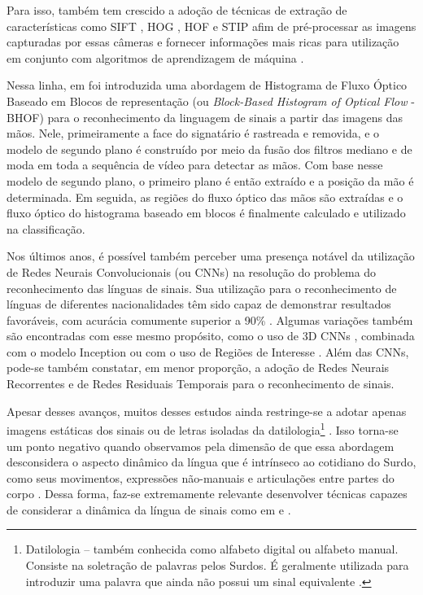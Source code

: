 Para isso, também tem crescido a adoção de técnicas de extração de características como SIFT \cite{lowe-2004}, HOG \cite{dalal-2005}, HOF \cite{laptev-2008} e STIP \cite{laptev-2008} \cite{recent-advances-dl-2017} afim de pré-processar as imagens capturadas por essas câmeras e fornecer informações mais ricas para utilização em conjunto com algoritmos de aprendizagem de máquina \cite{lim-2016, shanta-2018}.

Nessa linha, em \cite{lim-2016} foi introduzida uma abordagem de Histograma de Fluxo Óptico Baseado em Blocos de representação (ou \textit{Block-Based Histogram of Optical Flow} - BHOF) para o reconhecimento da linguagem de sinais a partir das imagens das mãos. Nele, primeiramente a face do signatário é rastreada e removida, e o modelo de segundo plano é construído por meio da fusão dos filtros mediano e de moda em toda a sequência de vídeo para detectar as mãos. Com base nesse modelo de segundo plano, o primeiro plano é então extraído e a posição da mão é determinada. Em seguida, as regiões do fluxo óptico das mãos são extraídas e o fluxo óptico do histograma baseado em blocos é finalmente calculado e utilizado na classificação. 

Nos últimos anos, é possível também perceber uma presença notável da utilização de Redes Neurais Convolucionais (ou CNNs) na resolução do problema do reconhecimento das línguas de sinais. Sua utilização para o reconhecimento de línguas de diferentes nacionalidades têm sido capaz de demonstrar resultados favoráveis, com acurácia comumente superior a 90\%  \cite{shanta-2018, ji-2017, taskiran-2018, rao-2018}. Algumas variações também são encontradas com esse mesmo propósito, como o uso de 3D CNNs \cite{elbadawy-2017}, combinada com o modelo Inception \cite{das-2018} ou com o uso de Regiões de Interesse \cite{sajanraj-2018}. Além das CNNs, pode-se também constatar, em menor proporção, a adoção de Redes Neurais Recorrentes \cite{konstantinidis-2018} e de Redes Residuais Temporais \cite{pigou-2017} para o reconhecimento de sinais.

Apesar desses avanços, muitos desses estudos ainda restringe-se a adotar apenas imagens estáticas dos sinais ou de letras isoladas da datilologia\footnote{
     Datilologia – também conhecida como alfabeto digital ou alfabeto manual. Consiste na soletração de palavras pelos Surdos. É geralmente utilizada para introduzir uma palavra que ainda não possui um sinal equivalente \cite{quadros-2004, pereira-choi-2011}.
} \cite{shanta-2018, taskiran-2018, elbadawy-2017, das-2018, sajanraj-2018}. Isso torna-se um ponto negativo quando observamos pela dimensão de que essa abordagem desconsidera o aspecto dinâmico da língua que é intrínseco ao cotidiano do Surdo, como seus movimentos, expressões não-manuais e articulações entre partes do corpo \cite{quadros-2004}. Dessa forma, faz-se extremamente relevante desenvolver técnicas capazes de considerar a dinâmica da língua de sinais como em \cite{konstantinidis-2018} e \cite{pigou-2017}. 

